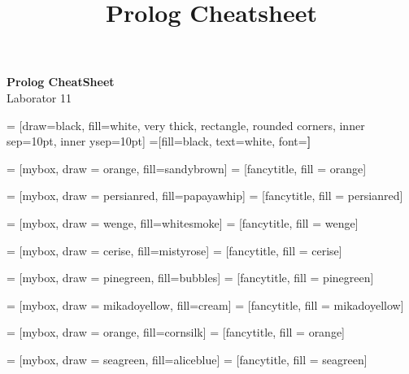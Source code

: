 \documentclass[a3paper]{article}
\title{Prolog Cheatsheet}
\begin{document}
\begin{center}{\huge{\textbf{Prolog CheatSheet}}}\\
{\large Laborator 11}
\end{center}

\begin{multicols*}{3}

 = [draw=black, fill=white, very thick,
    rectangle, rounded corners, inner sep=10pt, inner ysep=10pt]
 =[fill=black, text=white, font=\bfseries]

 = [mybox, draw = orange, fill=sandybrown]
 = [fancytitle, fill = orange]


 = [mybox, draw = persianred, fill=papayawhip]
 = [fancytitle, fill = persianred]

 = [mybox, draw = wenge, fill=whitesmoke]
 = [fancytitle, fill = wenge]

 = [mybox, draw = cerise, fill=mistyrose]
 = [fancytitle, fill = cerise]

 = [mybox, draw = pinegreen, fill=bubbles]
 = [fancytitle, fill = pinegreen]

 = [mybox, draw = mikadoyellow, fill=cream]
 = [fancytitle, fill = mikadoyellow]

 = [mybox, draw = orange, fill=cornsilk]
 = [fancytitle, fill = orange]

 = [mybox, draw = seagreen, fill=aliceblue]
 = [fancytitle, fill = seagreen]


\end{multicols*}
\end{document}
